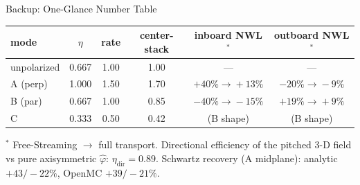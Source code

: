 \documentclass[11pt,aspectratio=169]{beamer}
\begin{document}
\begin{frame}{Backup: One-Glance Number Table}
\scriptsize
\begin{tabular}{@{}lccccc@{}}
\toprule
mode & $\eta$ & rate & center-stack & inboard NWL$^\ast$ & outboard NWL$^\ast$ \\
\midrule
unpolarized & 0.667 & 1.00 & 1.00 & --- & --- \\
A (perp) & 1.000 & 1.50 & 1.70 & $+40\%\!\to\!+13\%$ & $-20\%\!\to\!-9\%$ \\
B (par) & 0.667 & 1.00 & 0.85 & $-40\%\!\to\!-15\%$ & $+19\%\!\to\!+9\%$ \\
C & 0.333 & 0.50 & 0.42 & (B shape) & (B shape) \\
\bottomrule
\end{tabular}
\vfill
\footnotesize
$^\ast$ Free-Streaming $\to$ full transport. Directional efficiency of the pitched 3-D
field vs pure axisymmetric $\hat\varphi$: $\eta_{\text{dir}}=0.89$. Schwartz recovery
(A midplane): analytic $+43/-22\%$, OpenMC $+39/-21\%$.
\end{frame}
\end{document}
